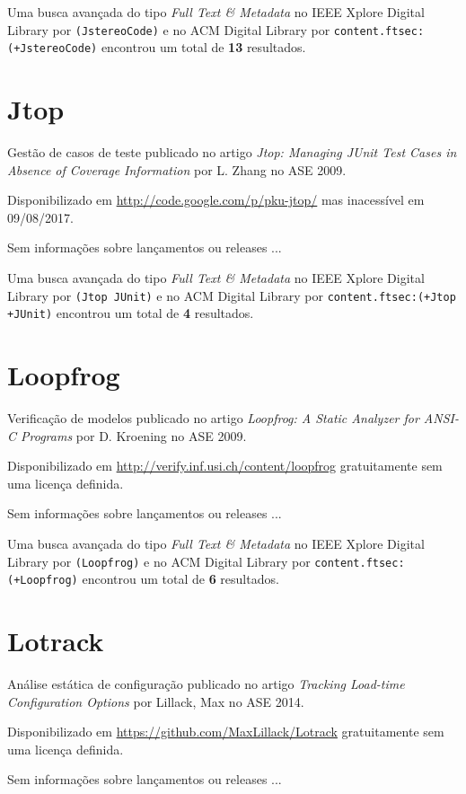 Uma busca avançada do tipo {\it Full Text \& Metadata} no IEEE Xplore Digital Library por
\texttt{(JstereoCode)}
e no ACM Digital Library por
\texttt{content.ftsec:(+JstereoCode)}
encontrou um total de
{\bf 13}
resultados.

\section{Jtop}

Gestão de casos de teste
publicado no artigo {\it Jtop: Managing JUnit Test Cases in Absence of Coverage Information}
por L. Zhang
no ASE 2009.

Disponibilizado em \url{http://code.google.com/p/pku-jtop/}
mas inacessível em 09/08/2017.

Sem informações sobre lançamentos ou releases ...


Uma busca avançada do tipo {\it Full Text \& Metadata} no IEEE Xplore Digital Library por
\texttt{(Jtop JUnit)}
e no ACM Digital Library por
\texttt{content.ftsec:(+Jtop +JUnit)}
encontrou um total de
{\bf 4}
resultados.

\section{Loopfrog}

Verificação de modelos
publicado no artigo {\it Loopfrog: A Static Analyzer for ANSI-C Programs}
por D. Kroening
no ASE 2009.

Disponibilizado em \url{http://verify.inf.usi.ch/content/loopfrog}
gratuitamente
sem uma licença definida.

Sem informações sobre lançamentos ou releases ...


Uma busca avançada do tipo {\it Full Text \& Metadata} no IEEE Xplore Digital Library por
\texttt{(Loopfrog)}
e no ACM Digital Library por
\texttt{content.ftsec:(+Loopfrog)}
encontrou um total de
{\bf 6}
resultados.

\section{Lotrack}

Análise estática de configuração
publicado no artigo {\it Tracking Load-time Configuration Options}
por Lillack, Max
no ASE 2014.

Disponibilizado em \url{https://github.com/MaxLillack/Lotrack}
gratuitamente
sem uma licença definida.

Sem informações sobre lançamentos ou releases ...



